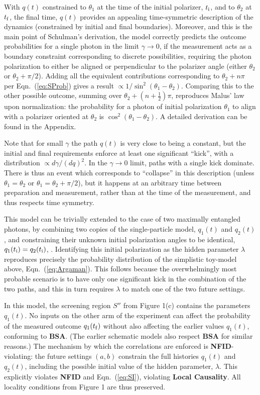 \documentclass[rmp, aps, preprint, longbibliography]{revtex4-1}
\newcommand{\eq}[1]{{Eqn.~(\ref{#1})}}
\begin{document}
With $q(t)$ constrained to $\theta_1$ at the time of the initial polarizer, $t_{\rm i}$, and to $\theta_2$ at $t_{\rm f}$, the final time, $q(t)$ provides an appealing time-symmetric description of the dynamics (constrained by initial and final boundaries).  Moreover, and this is the main point of Schulman's derivation, the model correctly predicts the outcome probabilities for a single photon in the limit $\gamma\to 0$, if the measurement acts as a boundary constraint corresponding to discrete possibilities, requiring the photon polarization to either be aligned or perpendicular to the polarizer angle (either $\theta_2$ or $\theta_2 + \pi/2$).  Adding all the equivalent contributions corresponding to $\theta_2 + n\pi$ per Eqn.~(\ref{eq:SProb}) gives a result $\propto 1/\sin^2(\theta_1-\theta_2)$. Comparing this to the other possible outcome, summing over $\theta_2 + (n+\frac{1}{2})\pi$, reproduces Malus' law upon normalization: the probability for a photon of initial polarization $\theta_1$ to align with a polarizer oriented at $\theta_2$ is $\cos^2(\theta_1-\theta_2)$.  A detailed derivation can be found in the Appendix.

Note that for small $\gamma$ the path $q(t)$ is very close to being a constant, but the initial and final requirements enforce at least one significant ``kick'', with a distribution $\propto d\gamma / (dq)^2$.  In the $\gamma\to 0$ limit, paths with a single kick dominate.  There is thus an event which corresponds to ``collapse'' in this description (unless $\theta_1=\theta_2$ or $\theta_1=\theta_2+\pi/2$), but it happens at an arbitrary time between preparation and measurement, rather than at the time of the measurement, and thus respects time symmetry.

This model can be trivially extended to the case of two maximally entangled photons, by combining two copies of the single-particle model, $q_1(t)$ and $q_2(t)$, and constraining their unknown initial polarization angles to be identical, $q_1(t_{\rm i}) = q_2(t_{\rm i})$, \cite{wharton2014, almada2016}.  Identifying this initial polarization as the hidden parameter $\lambda$ reproduces precisely the probability distribution of the simplistic toy-model above, \eq{eq:Argaman}.  This follows because the overwhelmingly most probable scenario is to have only one significant kick in the combination of the two paths, and this in turn requires $\lambda$ to match one of the two future settings.  

In this model, the screening region $S''$ from Figure 1(c) contains the parameters $q_1(t)$.  No inputs on the other arm of the experiment can affect the probability of the measured outcome $q_1(t_{\rm f})$ without also affecting the earlier values $q_1(t)$, conforming to {\bf BSA}.  (The earlier schematic models also respect {\bf BSA} for similar reasons.)
The mechanism by which the correlations are enforced is {{\bf NFID}-violating}: the future settings $(a,b)$ constrain the full histories $q_1(t)$ and $q_2(t)$, including the possible initial value of the hidden parameter, $\lambda$.  This explicitly violates {\bf NFID} and Eqn.~(\ref{eq:SI}), violating {\bf Local Causality}.  All locality conditions from Figure 1 are thus preserved. 
\end{document}
